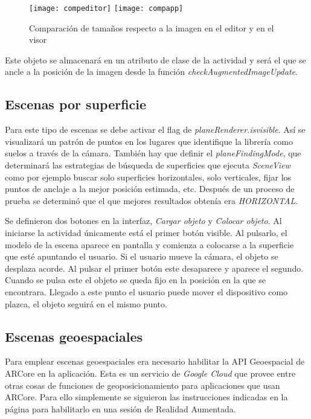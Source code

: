\begin{figure}[h]
    \centering
    \texttt{[image: compeditor]}
    \texttt{[image: compapp]}
    \caption[Comparación de tamaños de modelo en editor y visor]{Comparación de tamaños respecto a la imagen en el editor y en el visor}
    \label{fig:compeditor}
\end{figure}

Este objeto se almacenará en un atributo de clase de la actividad y será el que se ancle a la posición de la imagen desde la función \textit{checkAugmentedImageUpdate}.

\subsection{Escenas por superficie}

Para este tipo de escenas se debe activar el flag de \textit{planeRenderer.isvisible}. Así se visualizará un patrón de puntos en los lugares que identifique la librería como suelos a través de la cámara. También hay que definir el \textit{planeFindingMode}, que determinará las estrategias de búsqueda de superficies que ejecuta \textit{SceneView} como por ejemplo buscar solo superficies horizontales, solo verticales, fijar los puntos de anclaje a la mejor posición estimada, etc. Después de un proceso de prueba se determinó que el que mejores resultados obtenía era \textit{HORIZONTAL}.


Se definieron dos botones en la interfaz, \textit{Cargar objeto} y \textit{Colocar objeto}. Al iniciarse la actividad únicamente está el primer botón visible. Al pulsarlo, el modelo de la escena aparece en pantalla y comienza a colocarse a la superficie que esté apuntando el usuario. Si el usuario mueve la cámara, el objeto se desplaza acorde. Al pulsar el primer botón este desaparece y aparece el segundo. Cuando se pulsa este el objeto se queda fijo en la posición en la que se encontrara. Llegado a este punto el usuario puede mover el dispositivo como plazca, el objeto seguirá en el mismo punto.


\subsection{Escenas geoespaciales}

Para emplear escenas geoespaciales era necesario habilitar la API Geoespacial\cite{geospatialapi} de ARCore en la aplicación. Esta es un servicio de \textit{Google Cloud} que provee entre otras cosas de funciones de geoposicionamiento para aplicaciones que usan ARCore. Para ello simplemente se siguieron las instrucciones indicadas en la página para habilitarlo en una sesión de Realidad Aumentada.

